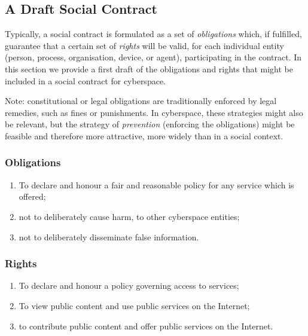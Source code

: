 \subsection{A Draft Social Contract}\label{draft}

Typically, a social contract is formulated as a set of {\em obligations} which,
if fulfilled, guarantee that a certain set of {\em rights} will be valid, for 
each individual entity (person, process, organisation, device, or agent), participating
in the contract. In this section we provide a first draft of the obligations
and rights that might be included in a social contract for cyberspace.

Note: constitutional or legal obligations are traditionally enforced by 
legal remedies, such as fines or punishments. In cyberspace, these strategies
might also be relevant, but the strategy of {\em prevention} (enforcing the obligations)
might be feasible and therefore more attractive, more widely than in a social
context.

\subsubsection*{Obligations}

\begin{enumerate}[O-1.]

\item\label{honorpolicy} To declare and honour a fair and reasonable
policy for any service which is offered;

\item\label{noharm} not to deliberately cause harm, to other cyberspace entities;

\item\label{nodisinf} not to deliberately disseminate false information.

\end{enumerate}

\subsubsection*{Rights}

\begin{enumerate}[R-1.]

\item\label{accesspolicy} To declare and honour a policy governing access to services;

\item\label{viewpublic} To view public content and use public services on the Internet;

\item\label{offerpublic} to contribute public content and offer public services on the Internet.


\end{enumerate}

